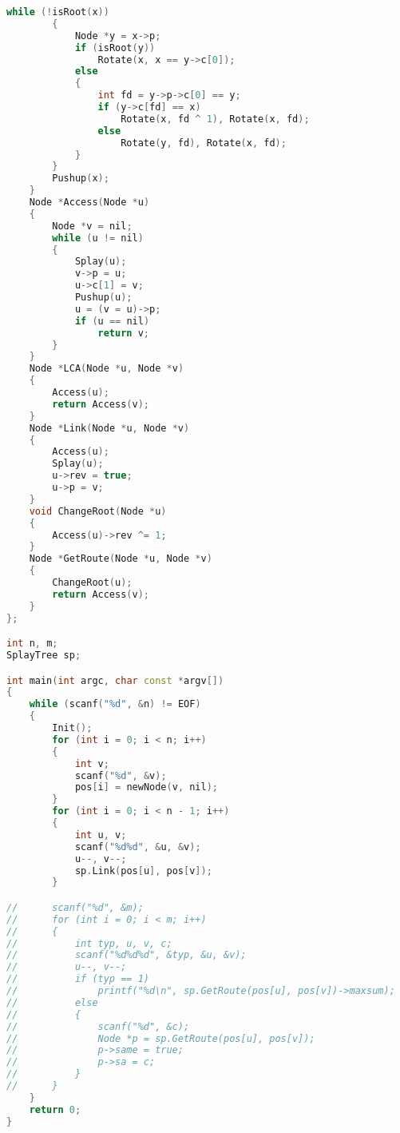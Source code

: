 \begin{lstlisting}[language=c++]
		while (!isRoot(x))
		{
			Node *y = x->p;
			if (isRoot(y))
				Rotate(x, x == y->c[0]);
			else
			{
				int fd = y->p->c[0] == y;
				if (y->c[fd] == x)
					Rotate(x, fd ^ 1), Rotate(x, fd);
				else
					Rotate(y, fd), Rotate(x, fd);
			}
		}
		Pushup(x);
	}
	Node *Access(Node *u)
	{
		Node *v = nil;
		while (u != nil)
		{
			Splay(u);
			v->p = u;
			u->c[1] = v;
			Pushup(u);
			u = (v = u)->p;
			if (u == nil)
				return v;
		}
	}
	Node *LCA(Node *u, Node *v)
	{
		Access(u);
		return Access(v);
	}
	Node *Link(Node *u, Node *v)
	{
		Access(u);
		Splay(u);
		u->rev = true;
		u->p = v;
	}
	void ChangeRoot(Node *u)
	{
		Access(u)->rev ^= 1;
	}
	Node *GetRoute(Node *u, Node *v)
	{
		ChangeRoot(u);
		return Access(v);
	}
};

int n, m;
SplayTree sp;

int main(int argc, char const *argv[])
{
	while (scanf("%d", &n) != EOF)
	{
		Init();
		for (int i = 0; i < n; i++)
		{
			int v;
			scanf("%d", &v);
			pos[i] = newNode(v, nil);
		}
		for (int i = 0; i < n - 1; i++)
		{
			int u, v;
			scanf("%d%d", &u, &v);
			u--, v--;
			sp.Link(pos[u], pos[v]);
		}

//		scanf("%d", &m);
//		for (int i = 0; i < m; i++)
//		{
//			int typ, u, v, c;
//			scanf("%d%d%d", &typ, &u, &v);
//			u--, v--;
//			if (typ == 1)
//				printf("%d\n", sp.GetRoute(pos[u], pos[v])->maxsum);
//			else
//			{
//				scanf("%d", &c);
//				Node *p = sp.GetRoute(pos[u], pos[v]);
//				p->same = true;
//				p->sa = c;
//			}
//		}
	}
	return 0;
}
		\end{lstlisting}
		
